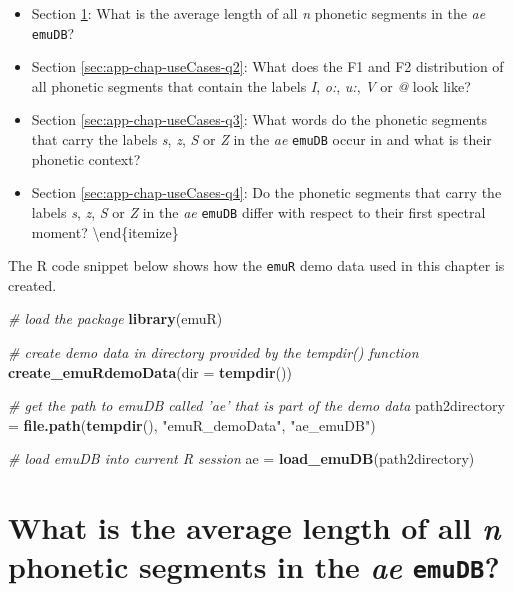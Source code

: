 \documentclass[]{book}
\newenvironment{Shaded}{\begin{snugshade}}{\end{snugshade}}
\newcommand{\CommentTok}[1]{\textcolor[rgb]{0.56,0.35,0.01}{\textit{#1}}}
\newcommand{\DataTypeTok}[1]{\textcolor[rgb]{0.13,0.29,0.53}{#1}}
\newcommand{\KeywordTok}[1]{\textcolor[rgb]{0.13,0.29,0.53}{\textbf{#1}}}
\newcommand{\NormalTok}[1]{#1}
\newcommand{\StringTok}[1]{\textcolor[rgb]{0.31,0.60,0.02}{#1}}
\providecommand{\tightlist}{%
  \setlength{\itemsep}{0pt}\setlength{\parskip}{0pt}}
\begin{document}
\begin{itemize}
\tightlist
\item
  Section \ref{sec:app-chap-useCases-q1}: What is the average length of all \emph{n} phonetic segments in the \emph{ae} \texttt{emuDB}?
\item
  Section \ref{sec:app-chap-useCases-q2}: What does the F1 and F2 distribution of all phonetic segments that contain the labels \emph{I}, \emph{o:}, \emph{u:}, \emph{V} or \emph{@} look like?
\item
  Section \ref{sec:app-chap-useCases-q3}: What words do the phonetic segments that carry the labels \emph{s}, \emph{z}, \emph{S} or \emph{Z} in the \emph{ae} \texttt{emuDB} occur in and what is their phonetic context?
\item
  Section \ref{sec:app-chap-useCases-q4}: Do the phonetic segments that carry the labels \emph{s}, \emph{z}, \emph{S} or \emph{Z} in the \emph{ae} \texttt{emuDB} differ with respect to their first spectral moment?
  \textbackslash{}end\{itemize\}
\end{itemize}

The R code snippet below shows how the \texttt{emuR} demo data used in this chapter is created.

\begin{Shaded}
\begin{Highlighting}[]
\CommentTok{# load the package }
\KeywordTok{library}\NormalTok{(emuR)}

\CommentTok{# create demo data in directory provided by the tempdir() function}
\KeywordTok{create_emuRdemoData}\NormalTok{(}\DataTypeTok{dir =} \KeywordTok{tempdir}\NormalTok{())}

\CommentTok{# get the path to emuDB called 'ae' that is part of the demo data}
\NormalTok{path2directory =}\StringTok{ }\KeywordTok{file.path}\NormalTok{(}\KeywordTok{tempdir}\NormalTok{(), }\StringTok{"emuR_demoData"}\NormalTok{, }\StringTok{"ae_emuDB"}\NormalTok{)}

\CommentTok{# load emuDB into current R session}
\NormalTok{ae =}\StringTok{ }\KeywordTok{load_emuDB}\NormalTok{(path2directory)}
\end{Highlighting}
\end{Shaded}

\hypertarget{sec:app-chap-useCases-q1}{%
\section{\texorpdfstring{What is the average length of all \emph{n} phonetic segments in the \emph{ae} \texttt{emuDB}?}{What is the average length of all n phonetic segments in the ae emuDB?}}\label{sec:app-chap-useCases-q1}}
\end{document}
